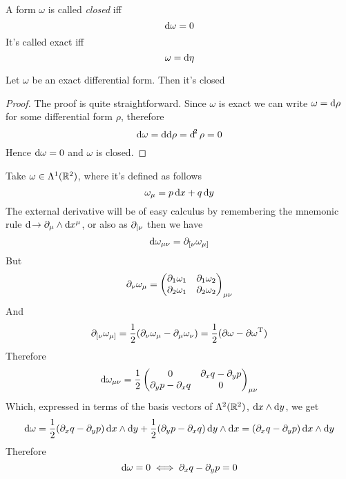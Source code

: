 \documentclass[../complete.tex]{subfiles}
\begin{document}
\begin{dfn}
	A form $\omega$ is called \textit{closed} iff
	\begin{equation}
		\operatorname{d\!}\omega=0
		\label{eq:closedform}
	\end{equation}
	It's called exact iff
	\begin{equation}
		\omega=\operatorname{d\!}\eta
		\label{eq:exactform}
	\end{equation}
\end{dfn}
\begin{thm}
	Let $\omega$ be an exact differential form. Then it's closed
\end{thm}
\begin{proof}
	The proof is quite straightforward. Since $\omega$ is exact we can write $\omega=\operatorname{d\!}\rho$ for some differential form $\rho$, therefore
	\begin{equation*}
		\operatorname{d\!}\omega=\operatorname{d\!}\operatorname{d\!}\rho=\operatorname{d\!}^2\rho=0
	\end{equation*}
	Hence $\operatorname{d\!}\omega=0$ and $\omega$ is closed.
\end{proof}
\begin{eg}
	Take $\omega\in\Lambda^1(\mathbb{R}^2)$, where it's defined as follows
	\begin{equation}
		\omega_\mu=p\operatorname{d\!} x+q\operatorname{d\!} y
		\label{eq:omega}
	\end{equation}
	The external derivative will be of easy calculus by remembering the mnemonic rule $\operatorname{d\!}\to\partial_\mu\wedge\operatorname{d\!} x^\mu$, or also as $\partial_{[\nu}$ then we have
	\begin{equation*}
		\operatorname{d\!}\omega_{\mu\nu}=\partial_{[\nu}\omega_{\mu]}
	\end{equation*}
	But
	\begin{equation*}
		\partial_\nu\omega_\mu=\begin{pmatrix}
			\partial_1\omega_1&\partial_1\omega_2\\
			\partial_2\omega_1&\partial_2\omega_2
		\end{pmatrix}_{\mu\nu}
	\end{equation*}
	And
	\begin{equation*}
		\partial_{[\nu}\omega_{\mu]}=\frac{1}{2}(\partial_\nu\omega_\mu-\partial_\mu\omega_\nu)=\frac{1}{2}(\partial\omega-{\partial\omega}^{\mathrm{T}})
	\end{equation*}
	Therefore
	\begin{equation*}
		\operatorname{d\!}\omega_{\mu\nu}=\frac{1}{2}\begin{pmatrix}
			0&\partial_xq-\partial_yp\\
			\partial_yp-\partial_xq&0
		\end{pmatrix}_{\mu\nu}
	\end{equation*}
	Which, expressed in terms of the basis vectors of $\Lambda^2(\mathbb{R}^2)$, $\operatorname{d\!} x\wedge\operatorname{d\!} y$, we get
	\begin{equation}
		\operatorname{d\!}\omega=\frac{1}{2}(\partial_xq-\partial_yp)\operatorname{d\!} x\wedge\operatorname{d\!} y+\frac{1}{2}(\partial_yp-\partial_xq)\operatorname{d\!} y\wedge\operatorname{d\!} x=(\partial_xq-\partial_yp)\operatorname{d\!} x\wedge\operatorname{d\!} y
		\label{eq:finalexamplecdfm}
	\end{equation}
	Therefore
	\begin{equation}
		\operatorname{d\!}\omega=0\iff\partial_xq-\partial_yp=0
		\label{eq:exactformeex}
	\end{equation}
\end{eg}
\end{document}
